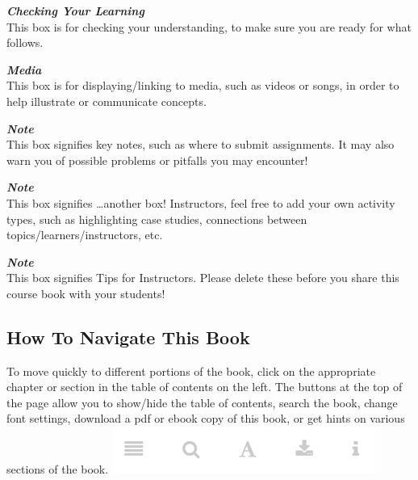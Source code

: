 \documentclass[
]{book}
\begin{document}
\begin{progress}
 \textbf{\emph{Checking Your Learning}}\\
 This box is for checking your understanding, to make sure you are ready
 for what follows.
 \end{progress}

\begin{video}
 \textbf{\emph{Media}}\\
 This box is for displaying/linking to media, such as videos or songs, in
 order to help illustrate or communicate concepts.
 \end{video}

\begin{caution}
 \textbf{\emph{Note}}\\
 This box signifies key notes, such as where to submit assignments. It
 may also warn you of possible problems or pitfalls you may encounter!
 \end{caution}

\begin{bonus}
 \textbf{\emph{Note}}\\
 This box signifies \ldots another box! Instructors, feel free to add
 your own activity types, such as highlighting case studies, connections
 between topics/learners/instructors, etc.
 \end{bonus}

\begin{feedback}
 \textbf{\emph{Note}}\\
 This box signifies Tips for Instructors. Please delete these before you
 share this course book with your students!
 \end{feedback}

\hypertarget{how-to-navigate-this-book}{%
\subsection*{How To Navigate This Book}\label{how-to-navigate-this-book}}

To move quickly to different portions of the book, click on the appropriate chapter or section in the table of contents on the left. The buttons at the top of the page allow you to show/hide the table of contents, search the book, change font settings, download a pdf or ebook copy of this book, or get hints on various sections of the book.
\includegraphics{assets/course-intro/menu.png}
\end{document}
